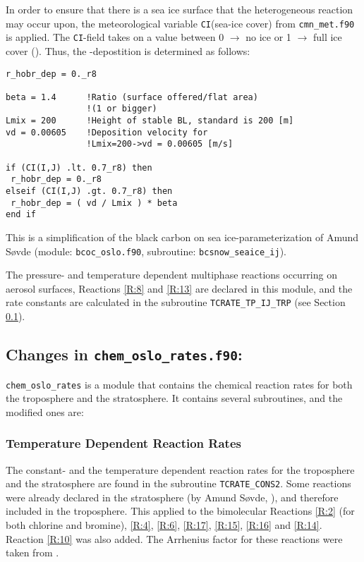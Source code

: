 \medskip 

In order to ensure that there is a sea ice surface that the heterogeneous reaction may occur upon, the meteorological variable \texttt{CI}(sea-ice cover) from \texttt{cmn\_met.f90} is applied. The \texttt{CI}-field takes on a value between 0 $\rightarrow$ no ice or 1 $\rightarrow$ full ice cover (\cite{SovdeManual}). Thus, the -depostition is determined as follows: 

\begin{lstlisting}
r_hobr_dep = 0._r8

beta = 1.4      !Ratio (surface offered/flat area)
                !(1 or bigger)
Lmix = 200      !Height of stable BL, standard is 200 [m]
vd = 0.00605    !Deposition velocity for 
                !Lmix=200->vd = 0.00605 [m/s]

if (CI(I,J) .lt. 0.7_r8) then
 r_hobr_dep = 0._r8
elseif (CI(I,J) .gt. 0.7_r8) then
 r_hobr_dep = ( vd / Lmix ) * beta
end if
\end{lstlisting}

This is a simplification of the black carbon on sea ice-parameterization of Amund Søvde (module: \texttt{bcoc\_oslo.f90}, subroutine: \texttt{bcsnow\_seaice\_ij}). 

\medskip 

 
The pressure- and temperature dependent multiphase reactions occurring on aerosol surfaces, Reactions \ref{R:8} and \ref{R:13} are declared in this module, and the rate constants are calculated in the subroutine \texttt{TCRATE\_TP\_IJ\_TRP} (see Section \ref{sec:chem_oslo_rates}). 



\subsection{Changes in \texttt{chem\_oslo\_rates.f90}:}\label{sec:chem_oslo_rates}



\texttt{chem\_oslo\_rates} is a module that contains the chemical reaction rates for both the troposphere and the stratosphere. It contains several subroutines, and the modified ones are: 


\subsubsection{Temperature Dependent Reaction Rates}\label{sec:temp_depend_react_rates}

The constant- and the temperature dependent reaction rates for the troposphere and the stratosphere are found in the subroutine \texttt{TCRATE\_CONS2}. Some reactions were already declared in the stratosphere (by Amund Søvde, \cite{SovdeManual}), and therefore included in the troposphere. This applied to the bimolecular Reactions \ref{R:2} (for both chlorine and bromine),  \ref{R:4}, \ref{R:6}, \ref{R:17}, \ref{R:15}, \ref{R:16} and \ref{R:14}. Reaction \ref{R:10} was also added. The Arrhenius factor for these reactions were taken from \cite{JPL}. 

